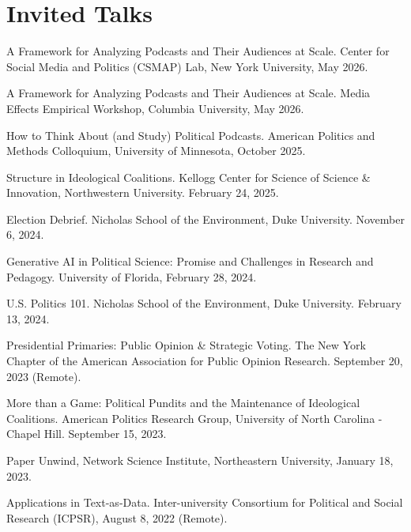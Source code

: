 \documentclass[letterpaper]{article}
\renewenvironment{itemize}{
  \begin{list}{}{
    \setlength{\leftmargin}{1.5em}
  }
}{
  \end{list}
}
\begin{document}
\section*{Invited Talks}
\begin{itemize}

\item A Framework for Analyzing Podcasts and Their Audiences at Scale. Center for Social Media and Politics (CSMAP) Lab, New York University, May 2026.

\item A Framework for Analyzing Podcasts and Their Audiences at Scale. Media Effects Empirical Workshop, Columbia University, May 2026.

\item How to Think About (and Study) Political Podcasts. American Politics and Methods Colloquium, University of Minnesota, October 2025.

\item Structure in Ideological Coalitions. Kellogg Center for Science of Science \& Innovation, Northwestern University. February 24, 2025.

\item Election Debrief. Nicholas School of the Environment, Duke University. November 6, 2024.

\item Generative AI in Political Science: Promise and Challenges in Research and Pedagogy. University of Florida, February 28, 2024.

\item U.S. Politics 101. Nicholas School of the Environment, Duke University. February 13, 2024.

\item Presidential Primaries: Public Opinion \& Strategic Voting. The New York Chapter of the American Association for Public Opinion Research. September 20, 2023 (Remote).

\item More than a Game: Political Pundits and the Maintenance of Ideological Coalitions. American Politics Research Group, University of North Carolina - Chapel Hill. September 15, 2023.

\item Paper Unwind, Network Science Institute, Northeastern University, January 18, 2023.

\item Applications in Text-as-Data. Inter-university Consortium for Political and Social Research (ICPSR), August 8, 2022 (Remote). 


\end{itemize}
\end{document}
